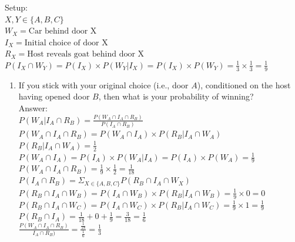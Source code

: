 \documentclass{article}
\begin{document}
\begin{enumerate}
    Setup: \\
    $ X,Y \in \{A,B,C\}$\\
    $ W_X = \text{Car behind door X}$\\
    $ I_X = \text{Initial choice of door X} $\\
    $ R_X = \text{Host reveals goat behind door X}$ \\
    $ P(I_X \cap W_Y) = P(I_X) \times P(W_Y | I_X) = P(I_X) \times P(W_Y) = \frac{1}{3} \times \frac{1}{3} = \frac{1}{9}$
    \begin{enumerate}
        \item If you stick with your original choice (i.e., door $A$), conditioned on the host having opened door $B$, then what is your probability of winning?
            \\ Answer: \\
            $ P(W_A | I_A \cap R_B) = \frac{P(W_A \cap I_A \cap R_B)}{P(I_A \cap R_B)}$ \\
            $ P(W_A \cap I_A \cap R_B) = P(W_A \cap I_A) \times P(R_B | I_A \cap W_A) $ \\
            $ P(R_B | I_A \cap W_A) = \frac{1}{2}$ \\
            $ P(W_A \cap I_A) = P(I_A) \times P(W_A | I_A) = P(I_A) \times P(W_A) = \frac{1}{9} $ \\
            $ P(W_A \cap I_A \cap R_B) = \frac{1}{9} \times \frac{1}{2} = \frac{1}{18} $ \\
            $ P(I_A \cap R_B) = \Sigma_{X \in \{A,B,C\}} P(R_B \cap I_A \cap W_X) $ \\
            $ P(R_B \cap I_A \cap W_B) = P(I_A \cap W_B) \times P(R_B | I_A \cap W_B) = \frac{1}{9} \times 0 = 0 $ \\
            $ P(R_B \cap I_A \cap W_C) = P(I_A \cap W_C) \times P(R_B | I_A \cap W_C) = \frac{1}{9} \times 1 = \frac{1}{9}$ \\
            $ P(R_B \cap I_A) = \frac{1}{18} + 0 + \frac{1}{9} = \frac{3}{18} = \frac{1}{6} $ \\
            $ \frac{P(W_A \cap I_A \cap R_B)}{I_A \cap R_B)} = \frac{\frac{1}{18}}{\frac{1}{6}} = \boxed{\frac{1}{3}} $


\end{enumerate}
\end{enumerate}
\end{document}
